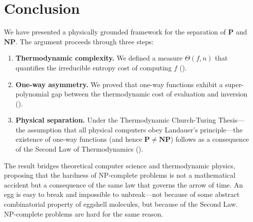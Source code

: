 \documentclass[12pt, a4paper]{article}
\newcommand{\Pc}{\mathbf{P}}
\newcommand{\NPc}{\mathbf{NP}}
\theoremstyle{plain}
\theoremstyle{definition}
\theoremstyle{remark}
\begin{document}
\section{Conclusion}\label{sec:conclusion}

We have presented a physically grounded framework for the separation of
$\Pc$ and $\NPc$. The argument proceeds through three steps:

\begin{enumerate}
  \item \textbf{Thermodynamic complexity.} We defined a measure $\Theta(f,n)$
    that quantifies the irreducible entropy cost of computing $f$
    ().
  \item \textbf{One-way asymmetry.} We proved that one-way functions
    exhibit a super-polynomial gap between the thermodynamic cost of
    evaluation and inversion ().
  \item \textbf{Physical separation.} Under the Thermodynamic Church-Turing
    Thesis---the assumption that all physical computers obey Landauer's
    principle---the existence of one-way functions (and hence
    $\Pc \neq \NPc$) follows as a consequence of the Second Law of
    Thermodynamics ().
\end{enumerate}

The result bridges theoretical computer science and thermodynamic physics,
proposing that the hardness of NP-complete problems is not a mathematical
accident but a consequence of the same law that governs the arrow of time.
An egg is easy to break and impossible to unbreak---not because of some
abstract combinatorial property of eggshell molecules, but because of
the Second Law. NP-complete problems are hard for the same reason.


\vspace{2em}
\noindent\hrulefill
\vspace{1em}







\vspace{3em}
\noindent\hrulefill
\vspace{1em}
\end{document}
